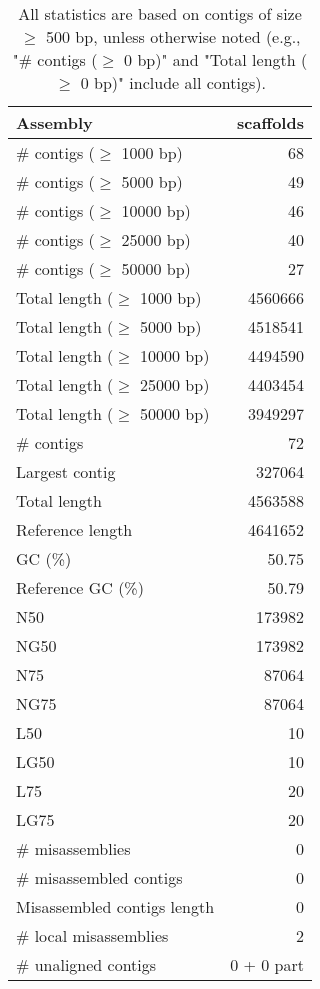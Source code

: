 \documentclass[12pt,a4paper]{article}
\begin{document}
\begin{table}[ht]
\begin{center}
\caption{All statistics are based on contigs of size $\geq$ 500 bp, unless otherwise noted (e.g., "\# contigs ($\geq$ 0 bp)" and "Total length ($\geq$ 0 bp)" include all contigs).}
\begin{tabular}{|l*{1}{|r}|}
\hline
Assembly & scaffolds \\ \hline
\# contigs ($\geq$ 1000 bp) & 68 \\ \hline
\# contigs ($\geq$ 5000 bp) & 49 \\ \hline
\# contigs ($\geq$ 10000 bp) & 46 \\ \hline
\# contigs ($\geq$ 25000 bp) & 40 \\ \hline
\# contigs ($\geq$ 50000 bp) & 27 \\ \hline
Total length ($\geq$ 1000 bp) & 4560666 \\ \hline
Total length ($\geq$ 5000 bp) & 4518541 \\ \hline
Total length ($\geq$ 10000 bp) & 4494590 \\ \hline
Total length ($\geq$ 25000 bp) & 4403454 \\ \hline
Total length ($\geq$ 50000 bp) & 3949297 \\ \hline
\# contigs & 72 \\ \hline
Largest contig & 327064 \\ \hline
Total length & 4563588 \\ \hline
Reference length & 4641652 \\ \hline
GC (\%) & 50.75 \\ \hline
Reference GC (\%) & 50.79 \\ \hline
N50 & 173982 \\ \hline
NG50 & 173982 \\ \hline
N75 & 87064 \\ \hline
NG75 & 87064 \\ \hline
L50 & 10 \\ \hline
LG50 & 10 \\ \hline
L75 & 20 \\ \hline
LG75 & 20 \\ \hline
\# misassemblies & 0 \\ \hline
\# misassembled contigs & 0 \\ \hline
Misassembled contigs length & 0 \\ \hline
\# local misassemblies & 2 \\ \hline
\# unaligned contigs & 0 + 0 part \\ \hline

\end{tabular}
\end{center}
\end{table}
\end{document}
